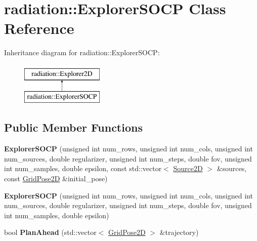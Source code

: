 \hypertarget{classradiation_1_1_explorer_s_o_c_p}{}\section{radiation\+:\+:Explorer\+S\+O\+CP Class Reference}
\label{classradiation_1_1_explorer_s_o_c_p}
Inheritance diagram for radiation\+:\+:Explorer\+S\+O\+CP\+:\begin{figure}[H]
\begin{center}
\leavevmode
\includegraphics[height=2.000000cm]{classradiation_1_1_explorer_s_o_c_p}
\end{center}
\end{figure}
\subsection*{Public Member Functions}
\begin{DoxyCompactItemize}
\item 
\hypertarget{classradiation_1_1_explorer_s_o_c_p_a97fb36225626931737703c5e7e244803}{}\label{classradiation_1_1_explorer_s_o_c_p_a97fb36225626931737703c5e7e244803} 
{\bfseries Explorer\+S\+O\+CP} (unsigned int num\+\_\+rows, unsigned int num\+\_\+cols, unsigned int num\+\_\+sources, double regularizer, unsigned int num\+\_\+steps, double fov, unsigned int num\+\_\+samples, double epsilon, const std\+::vector$<$ \hyperlink{classradiation_1_1_source2_d}{Source2D} $>$ \&sources, const \hyperlink{classradiation_1_1_grid_pose2_d}{Grid\+Pose2D} \&initial\+\_\+pose)
\item 
\hypertarget{classradiation_1_1_explorer_s_o_c_p_a956d553b04dd980577e800da8e78d899}{}\label{classradiation_1_1_explorer_s_o_c_p_a956d553b04dd980577e800da8e78d899} 
{\bfseries Explorer\+S\+O\+CP} (unsigned int num\+\_\+rows, unsigned int num\+\_\+cols, unsigned int num\+\_\+sources, double regularizer, unsigned int num\+\_\+steps, double fov, unsigned int num\+\_\+samples, double epsilon)
\item 
\hypertarget{classradiation_1_1_explorer_s_o_c_p_ae5ac57d153759f001bf8090ea32e37c7}{}\label{classradiation_1_1_explorer_s_o_c_p_ae5ac57d153759f001bf8090ea32e37c7} 
bool {\bfseries Plan\+Ahead} (std\+::vector$<$ \hyperlink{classradiation_1_1_grid_pose2_d}{Grid\+Pose2D} $>$ \&trajectory)
\end{DoxyCompactItemize}
